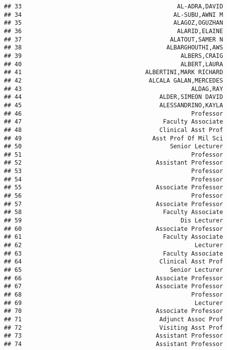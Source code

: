 \documentclass[
]{article}
\begin{document}
\begin{verbatim}
## 33                                            AL-ADRA,DAVID
## 34                                           AL-SUBU,AWNI M
## 35                                           ALAGOZ,OGUZHAN
## 36                                            ALARID,ELAINE
## 37                                          ALATOUT,SAMER N
## 38                                         ALBARGHOUTHI,AWS
## 39                                             ALBERS,CRAIG
## 40                                             ALBERT,LAURA
## 41                                   ALBERTINI,MARK RICHARD
## 42                                    ALCALA GALAN,MERCEDES
## 43                                                ALDAG,RAY
## 44                                       ALDER,SIMEON DAVID
## 45                                       ALESSANDRINO,KAYLA
## 46                                                Professor
## 47                                        Faculty Associate
## 48                                       Clinical Asst Prof
## 49                                     Asst Prof Of Mil Sci
## 50                                          Senior Lecturer
## 51                                                Professor
## 52                                      Assistant Professor
## 53                                                Professor
## 54                                                Professor
## 55                                      Associate Professor
## 56                                                Professor
## 57                                      Associate Professor
## 58                                        Faculty Associate
## 59                                             Dis Lecturer
## 60                                      Associate Professor
## 61                                        Faculty Associate
## 62                                                 Lecturer
## 63                                        Faculty Associate
## 64                                       Clinical Asst Prof
## 65                                          Senior Lecturer
## 66                                      Associate Professor
## 67                                      Associate Professor
## 68                                                Professor
## 69                                                 Lecturer
## 70                                      Associate Professor
## 71                                       Adjunct Assoc Prof
## 72                                       Visiting Asst Prof
## 73                                      Assistant Professor
## 74                                      Assistant Professor

\end{verbatim}
\end{document}
